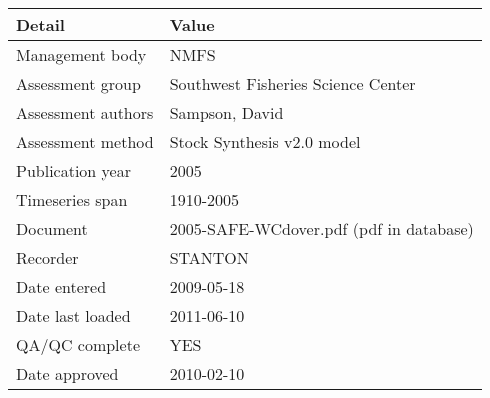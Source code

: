 \begin{table}[htb]
\centering
\begin{tabular}{lp{7cm}}
\toprule
Detail & Value \\
\midrule
Management body    & NMFS                                    \\
Assessment group   & Southwest Fisheries Science Center      \\
Assessment authors & Sampson, David                          \\
Assessment method  & Stock Synthesis v2.0 model              \\
Publication year   & 2005                                    \\
Timeseries span    & 1910-2005                               \\
Document           & 2005-SAFE-WCdover.pdf (pdf in database) \\
Recorder           & STANTON                                 \\
Date entered       & 2009-05-18                              \\
Date last loaded   & 2011-06-10                              \\
QA/QC complete     & YES                                     \\
Date approved      & 2010-02-10                              \\
\bottomrule
\end{tabular}
\label{tab:assessdet}
\end{table}
